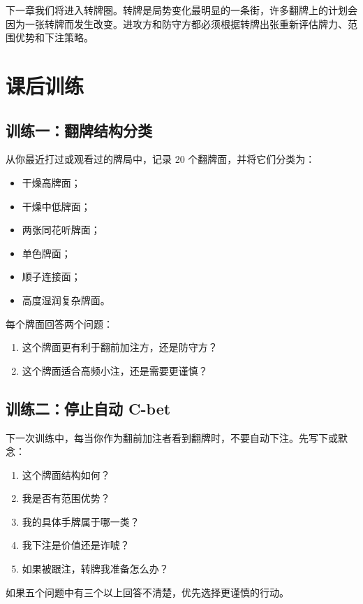 下一章我们将进入转牌圈。转牌是局势变化最明显的一条街，许多翻牌上的计划会因为一张转牌而发生改变。进攻方和防守方都必须根据转牌出张重新评估牌力、范围优势和下注策略。

\section{课后训练}

\subsection*{训练一：翻牌结构分类}

从你最近打过或观看过的牌局中，记录 20 个翻牌面，并将它们分类为：

\begin{itemize}
\item 干燥高牌面；
\item 干燥中低牌面；
\item 两张同花听牌面；
\item 单色牌面；
\item 顺子连接面；
\item 高度湿润复杂牌面。
\end{itemize}

每个牌面回答两个问题：

\begin{enumerate}
\item 这个牌面更有利于翻前加注方，还是防守方？
\item 这个牌面适合高频小注，还是需要更谨慎？
\end{enumerate}

\subsection*{训练二：停止自动 C-bet}

下一次训练中，每当你作为翻前加注者看到翻牌时，不要自动下注。先写下或默念：

\begin{enumerate}
\item 这个牌面结构如何？
\item 我是否有范围优势？
\item 我的具体手牌属于哪一类？
\item 我下注是价值还是诈唬？
\item 如果被跟注，转牌我准备怎么办？
\end{enumerate}

如果五个问题中有三个以上回答不清楚，优先选择更谨慎的行动。

